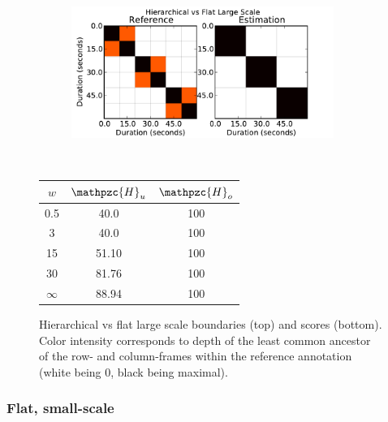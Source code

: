 \documentclass{article}
\def\shag{\ensuremath{\mathpzc{H}}}
\begin{document}
\begin{figure}
  \centering
  \begin{subfigure}{0.5\textwidth}
    \centering
    \includegraphics[width=0.94\textwidth]{plots/hier-flatlarge.pdf}
  \end{subfigure}%
  \\
  \begin{minipage}{0.5\textwidth}
    \centering
    \vspace{10pt}
    \begin{tabular}{|c|c|c|}
      \hline
      $w$       & $\shag_u$    & $\shag_o$      \\
      \hline
      0.5       & 40.0      & 100      \\     
      3         & 40.0      & 100      \\
      15        & 51.10     & 100    \\
      30        & 81.76     & 100    \\
      $\infty$  & 88.94     & 100    \\
      \hline
    \end{tabular}
  \end{minipage}
  \caption{Hierarchical vs flat large scale boundaries (top) and scores (bottom).  Color intensity corresponds to depth of the least common ancestor of the row- and column-frames 
  within the reference annotation (white being 0, black being maximal).}
  \label{fig:hier-flatlarge}
\end{figure}

\subsubsection{Flat, small-scale}
\end{document}
